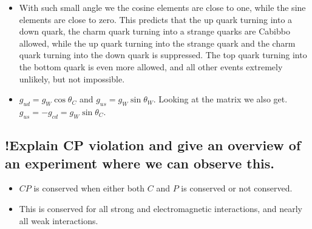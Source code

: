 \documentclass{article}
\begin{document}
\begin{itemize}
    \item With such small angle we the cosine elements are close to one, while the sine elements are close to zero. This predicts that the up quark turning into a down quark, the charm quark turning into a strange quarks are Cabibbo allowed, while the up quark turning into the strange quark and the charm quark turning into the down quark is suppressed. The top quark turning into the bottom quark is even more allowed, and all other events extremely unlikely, but not impossible. 
    \item $g_{ud} = g_{W} \cos θ_{C}$ and $g_{us} = g_{W} \sin θ_{W}$. Looking at the matrix we also get. $g_{us} = - g_{cd} = g_{W} \sin θ_{C}$. 
\end{itemize}


\subsection{!Explain CP violation and give an overview of an experiment where we can observe this.}
\begin{itemize}
    \item $CP$ is conserved when either both $C$ and $P$ is conserved or not conserved. 
    \item This is conserved for all strong and electromagnetic interactions, and nearly all weak interactions. 
\end{itemize}
\end{document}
